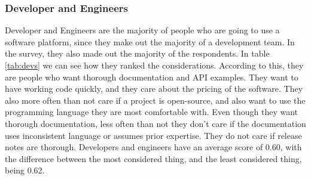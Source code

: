 \documentclass{article}
\begin{document}
\subsubsection{Developer and Engineers}
Developer and Engineers are the majority of people who are going to use a software platform, since they make out the majority of a development team. In the survey, they also made out the majority of the respondents. In table \ref{tab:devs} we can see how they ranked the considerations. According to this, they are people who want thorough documentation and API examples. They want to have working code quickly, and they care about the pricing of the software. They also more often than not care if a project is open-source, and also want to use the programming language they are most comfortable with. Even though they want thorough documentation, less often than not they don't care if the documentation uses inconsistent language or assumes prior expertise. They do not care if release notes are thorough. Developers and engineers have an average score of 0.60, with the difference between the most considered thing, and the least considered thing, being 0.62.
\end{document}
